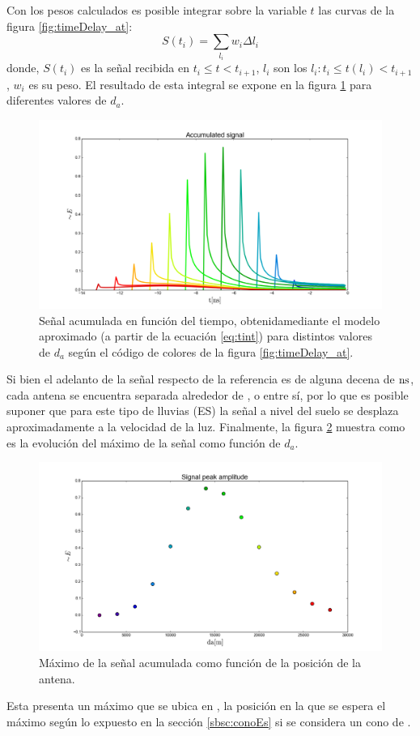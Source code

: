 	Con los pesos calculados es posible integrar sobre la variable $t$ las curvas de la figura \ref{fig:timeDelay_at}:
	\begin{equation}
	S(t_i)=\sum_{l_i}w_i\Delta l_i
	\label{eq:tint}
	\end{equation}
	donde, $S(t_i)$ es la señal recibida en $t_i\leq t<t_{i+1}$, $l_i$ son los $l_i:t_i\leq t(l_i)<t_{i+1}$, $w_i$ es su peso.
	El resultado de esta integral se expone en la figura \ref{fig:timeDelay_as} para diferentes valores de $d_a$.
	\begin{figure}[ht!]
		\centering
		\includegraphics[width=\textwidth]{./fig/EASRadio/timeDelay_as}
		\caption{\label{fig:timeDelay_as}
		Se\~nal acumulada en funci\'on del tiempo, obtenidamediante el modelo aproximado (a partir de la ecuación \ref{eq:tint}) para distintos valores de $d_a$ seg\'un el c\'odigo de colores de la figura \ref{fig:timeDelay_at}.
		}
	\end{figure}
	Si bien el adelanto de la señal respecto de la referencia es de alguna decena de $\rm ns$, cada antena se encuentra separada alrededor de , o  entre sí, por lo que es posible suponer que para este tipo de lluvias (ES) la señal a nivel del suelo se desplaza aproximadamente a la velocidad de la luz.
	Finalmente, la figura \ref{fig:timeDelay_spa} muestra como es la evolución del máximo de la señal como función de $d_a$.	
	\begin{figure}[ht!]
		\centering
		\includegraphics[width=\textwidth]{./fig/EASRadio/timeDelay_spa}
		\caption{\label{fig:timeDelay_spa}
		M\'aximo de la se\~nal acumulada como función de la posici\'on de la antena.
		}
	\end{figure}
	Esta presenta un máximo que se ubica en , la posición en la que se espera el máximo según lo expuesto en la sección \ref{sbsc:conoEs} si se considera un cono \cher{} de .
	